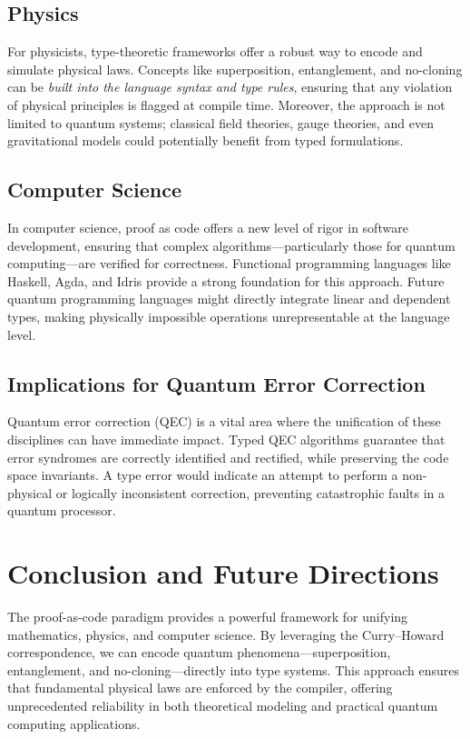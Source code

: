 \documentclass[12pt]{article}
\begin{document}
\begin{itemize}[label=$\bullet$]
\subsection{Physics}
For physicists, type-theoretic frameworks offer a robust way to encode and simulate physical laws. Concepts like superposition, entanglement, and no-cloning can be \emph{built into the language syntax and type rules}, ensuring that any violation of physical principles is flagged at compile time. Moreover, the approach is not limited to quantum systems; classical field theories, gauge theories, and even gravitational models could potentially benefit from typed formulations.

\subsection{Computer Science}
In computer science, proof as code offers a new level of rigor in software development, ensuring that complex algorithms—particularly those for quantum computing—are verified for correctness. Functional programming languages like Haskell, Agda, and Idris provide a strong foundation for this approach. Future quantum programming languages might directly integrate linear and dependent types, making physically impossible operations unrepresentable at the language level.

\subsection{Implications for Quantum Error Correction}
Quantum error correction (QEC) is a vital area where the unification of these disciplines can have immediate impact. Typed QEC algorithms guarantee that error syndromes are correctly identified and rectified, while preserving the code space invariants. A type error would indicate an attempt to perform a non-physical or logically inconsistent correction, preventing catastrophic faults in a quantum processor.

\section{Conclusion and Future Directions}
\label{sec:conclusion}
The proof-as-code paradigm provides a powerful framework for unifying mathematics, physics, and computer science. By leveraging the Curry--Howard correspondence, we can encode quantum phenomena—superposition, entanglement, and no-cloning—directly into type systems. This approach ensures that fundamental physical laws are enforced by the compiler, offering unprecedented reliability in both theoretical modeling and practical quantum computing applications.


\end{itemize}
\end{document}
